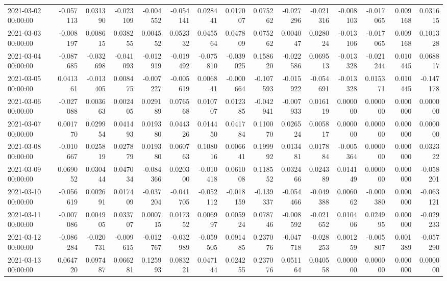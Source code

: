 \begin{tabular}{lrrrrrrrrrrrrrr}
2021-03-02 00:00:00 & -0.057113 & 0.031390 & -0.023109 & -0.004552 & -0.054141 & 0.028441 & 0.017007 & 0.075262 & -0.027296 & -0.021316 & -0.008103 & -0.017065 & 0.009168 & 0.031615 \\
2021-03-03 00:00:00 & -0.008197 & 0.008615 & 0.038255 & 0.004552 & 0.052332 & 0.045564 & 0.047809 & 0.075262 & 0.004047 & 0.028024 & -0.013106 & -0.017065 & 0.009168 & 0.101328 \\
2021-03-04 00:00:00 & -0.087685 & -0.032698 & -0.041093 & -0.012919 & -0.019492 & -0.075810 & -0.039025 & 0.158620 & -0.022586 & 0.069513 & -0.013328 & -0.021244 & 0.010445 & 0.068817 \\
2021-03-05 00:00:00 & 0.041361 & -0.013405 & 0.008475 & -0.007227 & -0.005619 & 0.006841 & -0.000664 & -0.107593 & -0.015922 & -0.054691 & -0.013328 & 0.015371 & 0.010445 & -0.147178 \\
2021-03-06 00:00:00 & -0.027088 & 0.003663 & 0.002405 & 0.029189 & 0.076568 & 0.010707 & 0.012385 & -0.042941 & -0.007933 & 0.016119 & 0.000000 & 0.000000 & 0.000000 & 0.000000 \\
2021-03-07 00:00:00 & 0.001770 & 0.029954 & 0.041493 & 0.019380 & 0.044326 & 0.014450 & 0.041784 & 0.110070 & 0.026524 & 0.005817 & 0.000000 & 0.000000 & 0.000000 & 0.000000 \\
2021-03-08 00:00:00 & -0.010667 & 0.025819 & 0.027879 & 0.019380 & 0.060763 & 0.108016 & 0.006641 & 0.199992 & 0.013481 & 0.017884 & -0.005364 & 0.000000 & 0.000000 & 0.032322 \\
2021-03-09 00:00:00 & 0.069052 & 0.030444 & 0.047034 & -0.084366 & 0.020300 & -0.010418 & 0.061008 & 0.118552 & 0.032466 & 0.024389 & 0.014149 & 0.000000 & 0.000000 & -0.058201 \\
2021-03-10 00:00:00 & -0.056619 & 0.002691 & 0.017409 & -0.037204 & -0.041705 & -0.052112 & -0.018159 & -0.139337 & -0.054466 & -0.049388 & 0.006062 & -0.000380 & 0.000000 & -0.063121 \\
2021-03-11 00:00:00 & -0.007086 & 0.004905 & 0.033707 & 0.000715 & 0.017352 & 0.006997 & 0.005924 & 0.078746 & -0.008592 & -0.021652 & 0.010406 & 0.024995 & 0.000000 & -0.029233 \\
2021-03-12 00:00:00 & -0.086284 & -0.020731 & -0.009615 & -0.012767 & -0.032989 & -0.059505 & 0.091485 & 0.237076 & -0.047718 & -0.028253 & 0.001259 & -0.005807 & 0.001389 & -0.057290 \\
2021-03-13 00:00:00 & 0.064720 & 0.097487 & 0.066281 & 0.125993 & 0.083221 & 0.047144 & 0.024255 & 0.237076 & 0.051164 & 0.040558 & 0.000000 & 0.000000 & 0.000000 & 0.000000 \\

\end{tabular}
